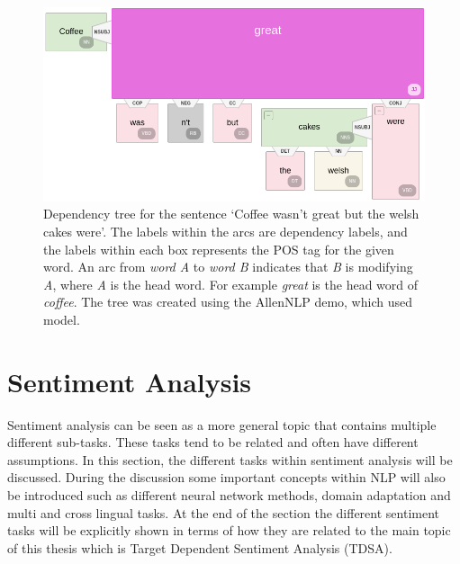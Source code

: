 \begin{figure}[!h]
    \centering
    \includegraphics[scale=0.28]{images/lit_review/dependency_parse_tree.png}
    \caption{Dependency tree for the sentence `Coffee wasn't great but the welsh cakes were'. The labels within the arcs are dependency labels, and the labels within each box represents the POS tag for the given word. An arc from \textit{word A} to \textit{word B} indicates that \textit{B} is modifying \textit{A}, where \textit{A} is the head word. For example \textit{great} is the head word of \textit{coffee}. The tree was created using the AllenNLP demo, which used \citet{DBLP:conf/iclr/DozatM17} model.}
    \label{fig:lit_review_dependency_parse_tree}
\end{figure}

\section{Sentiment Analysis}
Sentiment analysis can be seen as a more general topic that contains multiple different sub-tasks. These tasks tend to be related and often have different assumptions. In this section, the different tasks within sentiment analysis  will be discussed. During the discussion some important concepts within NLP will also be introduced such as different neural network methods, domain adaptation and multi and cross lingual tasks. At the end of the section the different sentiment tasks will be explicitly shown in terms of how they are related to the main topic of this thesis which is Target Dependent Sentiment Analysis (TDSA).

